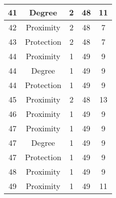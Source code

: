 \documentclass[results.tex]{subfiles}
\begin{document}
\begin{center}
\begin{tabular}{| c || c | c | c | c |}
            \hline
            41                      & Degree                       & 2                      & 48                      & 11                   \\
            \hline
            42                      & Proximity                    & 2                      & 48                      & 7                    \\
            \hline
            43                      & Protection                   & 2                      & 48                      & 7                    \\
            \hline
            44                      & Proximity                    & 1                      & 49                      & 9                    \\
            \hline
            44                      & Degree                       & 1                      & 49                      & 9                    \\
            \hline
            44                      & Protection                   & 1                      & 49                      & 9                    \\
            \hline
            45                      & Proximity                    & 2                      & 48                      & 13                   \\
            \hline
            46                      & Proximity                    & 1                      & 49                      & 9                    \\
            \hline
            47                      & Proximity                    & 1                      & 49                      & 9                    \\
            \hline
            47                      & Degree                       & 1                      & 49                      & 9                    \\
            \hline
            47                      & Protection                   & 1                      & 49                      & 9                    \\
            \hline
            48                      & Proximity                    & 1                      & 49                      & 9                    \\
            \hline
            49                      & Proximity                    & 1                      & 49                      & 11                   \\
            \hline
        \end{tabular}
    \end{center}
\end{document}
